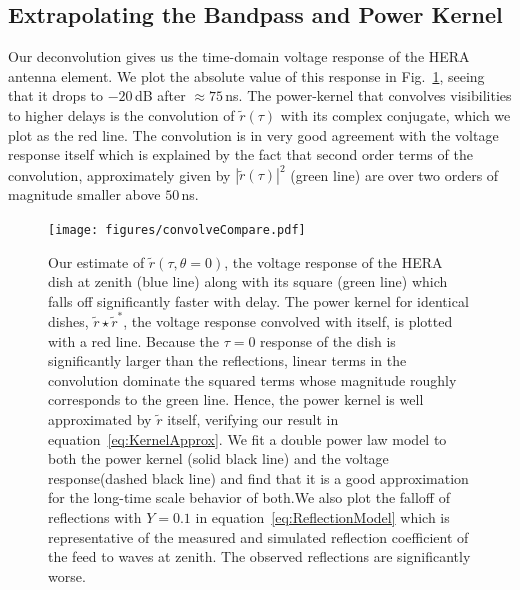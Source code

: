 \documentclass[onecolumn]{emulateapj}
\begin{document}
\subsection{Extrapolating the Bandpass and Power Kernel}
Our deconvolution gives us the time-domain voltage response of the HERA antenna element. We plot the absolute value of this response in Fig.~\ref{fig:KernelCompare}, seeing that it drops to $-20$\,dB after $\approx 75$\,ns. The power-kernel that convolves visibilities to higher delays is the convolution of $\widetilde{r}(\tau)$ with its complex conjugate, which we plot as the red line. The convolution is in very good agreement with the voltage response itself which is explained by the fact that second order terms of the convolution, approximately given by $|\widetilde{r}(\tau)|^2$ (green line) are over two orders of magnitude smaller above $50$\,ns.
\begin{figure}
\texttt{[image: figures/convolveCompare.pdf]}
\caption{Our estimate of $\widetilde{r}(\tau,\theta=0)$, the voltage response of the HERA dish at zenith (blue line) along with its square (green line) which falls off significantly faster with delay. The power kernel for identical dishes, $\widetilde{r}\star\widetilde{r}^*$, the voltage response convolved with itself, is plotted with a red line. Because the $\tau=0$ response of the dish is significantly larger than the reflections, linear terms in the convolution dominate the squared terms whose magnitude roughly corresponds to the green line. Hence, the power kernel is well approximated by $\widetilde{r}$ itself, verifying our result in equation~\ref{eq:KernelApprox}. We fit a double power law model to both the power kernel (solid black line) and the voltage response(dashed black line) and find that it is a good approximation for the long-time scale behavior of both.We also plot the falloff of reflections with $Y=0.1$ in equation~\ref{eq:ReflectionModel} which is representative of the measured and simulated reflection coefficient of the feed to waves at zenith. The observed reflections are significantly worse.}
\label{fig:KernelCompare}
\end{figure}
\end{document}
